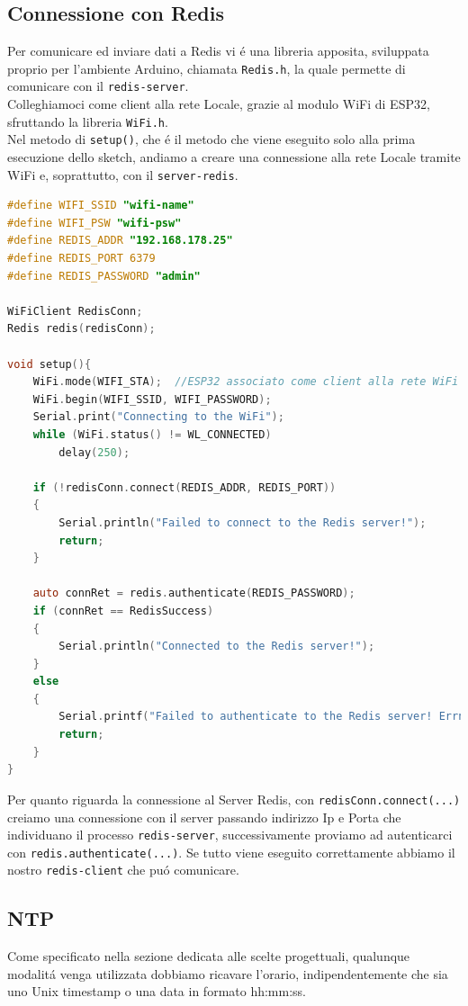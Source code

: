 \subsection{Connessione con Redis}
Per comunicare ed inviare dati a Redis vi é una libreria apposita, sviluppata proprio per l'ambiente Arduino, chiamata \texttt{Redis.h},
la quale permette di comunicare con il \texttt{redis-server}.\\
Colleghiamoci come client alla rete Locale, grazie al modulo WiFi di ESP32, sfruttando la libreria \texttt{WiFi.h}.\\
Nel metodo di \texttt{setup()}, che é il metodo che viene eseguito solo alla prima esecuzione dello sketch, andiamo a creare una connessione alla rete Locale tramite WiFi e, soprattutto, con il \texttt{server-redis}.
\begin{lstlisting}[autogobble, style=c, language=C]
#define WIFI_SSID "wifi-name"
#define WIFI_PSW "wifi-psw"
#define REDIS_ADDR "192.168.178.25"
#define REDIS_PORT 6379
#define REDIS_PASSWORD "admin"

WiFiClient RedisConn;
Redis redis(redisConn);

void setup(){
    WiFi.mode(WIFI_STA);  //ESP32 associato come client alla rete WiFi
    WiFi.begin(WIFI_SSID, WIFI_PASSWORD);
    Serial.print("Connecting to the WiFi");
    while (WiFi.status() != WL_CONNECTED)
        delay(250);

    if (!redisConn.connect(REDIS_ADDR, REDIS_PORT))
    {
        Serial.println("Failed to connect to the Redis server!");
        return;
    }

    auto connRet = redis.authenticate(REDIS_PASSWORD);
    if (connRet == RedisSuccess)
    {
        Serial.println("Connected to the Redis server!");
    }
    else
    {
        Serial.printf("Failed to authenticate to the Redis server! Errno: %d\n", (int)connRet);
        return;
    }
}
\end{lstlisting}

Per quanto riguarda la connessione al Server Redis,  con \texttt{redisConn.connect(...)} creiamo una connessione con il server
passando indirizzo Ip e Porta che individuano il processo \texttt{redis-server}, successivamente proviamo ad autenticarci con
\texttt{redis.authenticate(...)}. Se tutto viene eseguito correttamente abbiamo il nostro \texttt{redis-client} che puó
comunicare.


\subsection{NTP}
Come specificato nella sezione dedicata alle scelte progettuali, qualunque modalitá venga utilizzata dobbiamo ricavare l'orario,
indipendentemente che sia uno Unix timestamp o una data in formato hh:mm:ss.
